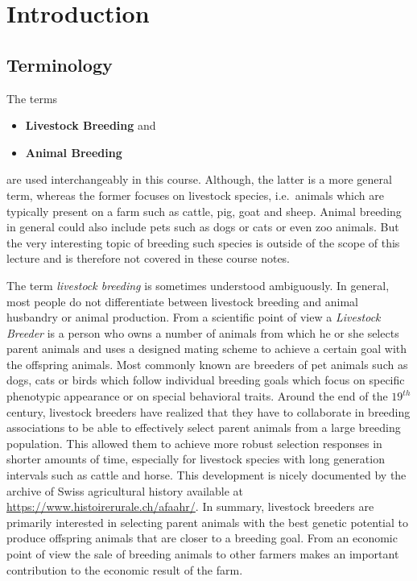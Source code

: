\documentclass[
]{book}
\providecommand{\tightlist}{%
  \setlength{\itemsep}{0pt}\setlength{\parskip}{0pt}}
\theoremstyle{definition}
\theoremstyle{definition}
\theoremstyle{definition}
\theoremstyle{remark}
\begin{document}
\hypertarget{intro-lbg}{%
\chapter{Introduction}\label{intro-lbg}}

\hypertarget{intro-lbg-terminology}{%
\section{Terminology}\label{intro-lbg-terminology}}

The terms

\begin{itemize}
\tightlist
\item
  \textbf{Livestock Breeding} and
\item
  \textbf{Animal Breeding}
\end{itemize}

are used interchangeably in this course. Although, the latter is a more general term, whereas the former focuses on livestock species, i.e.~animals which are typically present on a farm such as cattle, pig, goat and sheep. Animal breeding in general could also include pets such as dogs or cats or even zoo animals. But the very interesting topic of breeding such species is outside of the scope of this lecture and is therefore not covered in these course notes.

The term \emph{livestock breeding} is sometimes understood ambiguously. In general, most people do not differentiate between livestock breeding and animal husbandry or animal production. From a scientific point of view a \emph{Livestock Breeder} is a person who owns a number of animals from which he or she selects parent animals and uses a designed mating scheme to achieve a certain goal with the offspring animals. Most commonly known are breeders of pet animals such as dogs, cats or birds which follow individual breeding goals which focus on specific phenotypic appearance or on special behavioral traits. Around the end of the \(19^{th}\) century, livestock breeders have realized that they have to collaborate in breeding associations to be able to effectively select parent animals from a large breeding population. This allowed them to achieve more robust selection responses in shorter amounts of time, especially for livestock species with long generation intervals such as cattle and horse. This development is nicely documented by the archive of Swiss agricultural history available at \url{https://www.histoirerurale.ch/afaahr/}. In summary, livestock breeders are primarily interested in selecting parent animals with the best genetic potential to produce offspring animals that are closer to a breeding goal. From an economic point of view the sale of breeding animals to other farmers makes an important contribution to the economic result of the farm.
\end{document}
